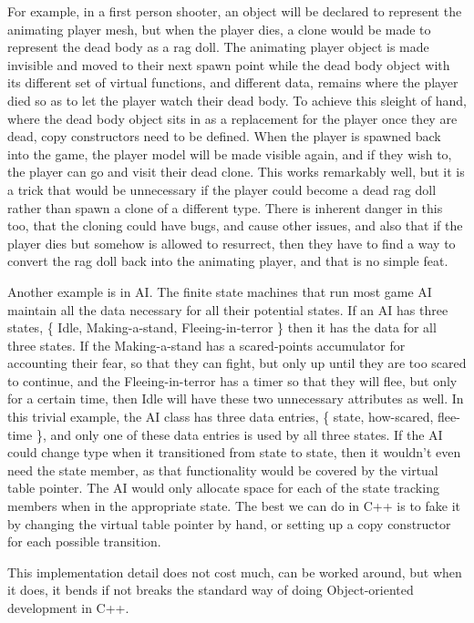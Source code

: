 For example, in a first person shooter, an object will be declared to represent
the animating player mesh, but when the player dies, a clone would be made to
represent the dead body as a rag doll. The animating player object is made
invisible and moved to their next spawn point while the dead body object with
its different set of virtual functions, and different data, remains where the
player died so as to let the player watch their dead body. To achieve this
sleight of hand, where the dead body object sits in as a replacement for the
player once they are dead, copy constructors need to be defined. When the
player is spawned back into the game, the player model will  be made visible
again, and if they wish to, the player can go and visit their dead clone. This
works remarkably well, but it is a trick that would be unnecessary if the
player could become a dead rag doll rather than spawn a clone of a different
type. There is inherent danger in this too, that the cloning could have bugs,
and cause other issues, and also that if the player dies but somehow is allowed
to resurrect, then they have to find a way to convert the rag doll back into
the animating player, and that is no simple feat.

Another example is in AI. The finite state machines that run most game AI
maintain all the data necessary for all their potential states. If an AI has
three states, \{ Idle, Making-a-stand, Fleeing-in-terror \} then it has the
data for all three states. If the Making-a-stand has a scared-points
accumulator for accounting their fear, so that they can fight, but only up
until they are too scared to continue, and the Fleeing-in-terror has a timer so
that they will flee, but only for a certain time, then Idle will have these two
unnecessary attributes as well. In this trivial example, the AI class has three
data entries, \{ state, how-scared, flee-time \}, and only one of these data
entries is used by all three states. If the AI could change type when it
transitioned from state to state, then it wouldn't even need the state member,
as that functionality would be covered by the virtual table pointer. The AI
would only allocate space for each of the state tracking members when in the
appropriate state. The best we can do in C++ is to fake it by changing the
virtual table pointer by hand, or setting up a copy constructor for each
possible transition.

This implementation detail does not cost much, can be worked around, but when
it does, it bends if not breaks the standard way of doing Object-oriented
development in C++.


